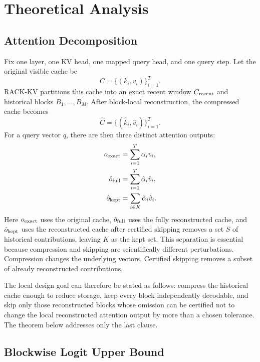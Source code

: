 \section{Theoretical Analysis}

\subsection{Attention Decomposition}

Fix one layer, one KV head, one mapped query head, and one query step. Let the original visible cache be
\begin{equation}
  C = \{(k_i,v_i)\}_{i=1}^{T}.
\end{equation}
RACK-KV partitions this cache into an exact recent window \(C_{\mathrm{recent}}\) and historical blocks \(B_1,\dots,B_M\). After block-local reconstruction, the compressed cache becomes
\begin{equation}
  \hat{C} = \{(\hat{k}_i,\hat{v}_i)\}_{i=1}^{T}.
\end{equation}
For a query vector \(q\), there are then three distinct attention outputs:
\begin{align}
  o_{\mathrm{exact}}
  &=
  \sum_{i=1}^{T} \alpha_i v_i,
  \\
  \hat{o}_{\mathrm{full}}
  &=
  \sum_{i=1}^{T} \hat{\alpha}_i \hat{v}_i,
  \\
  \hat{o}_{\mathrm{kept}}
  &=
  \sum_{i \in K} \tilde{\alpha}_i \hat{v}_i.
\end{align}
Here \(o_{\mathrm{exact}}\) uses the original cache, \(\hat{o}_{\mathrm{full}}\) uses the fully reconstructed cache, and \(\hat{o}_{\mathrm{kept}}\) uses the reconstructed cache after certified skipping removes a set \(S\) of historical contributions, leaving \(K\) as the kept set. This separation is essential because compression and skipping are scientifically different perturbations. Compression changes the underlying vectors. Certified skipping removes a subset of already reconstructed contributions.

The local design goal can therefore be stated as follows: compress the historical cache enough to reduce storage, keep every block independently decodable, and skip only those reconstructed blocks whose omission can be certified not to change the local reconstructed attention output by more than a chosen tolerance. The theorem below addresses only the last clause.

\subsection{Blockwise Logit Upper Bound}

